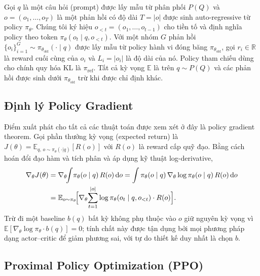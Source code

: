 \documentclass[11pt,a4paper]{article}
\begin{document}
Gọi \(q\) là một câu hỏi (prompt) được lấy mẫu từ phân phối \(P(Q)\) và
\(o=(o_1,\ldots,o_T)\) là một phản hồi có độ dài \(T=|o|\) được sinh
auto-regressive từ policy \(\pi_\theta\). Chúng tôi ký hiệu \(o_{<t}=(o_1,\ldots,o_{t-1})\)
cho tiền tố và định nghĩa policy theo token
\(\pi_\theta(o_t\mid q,o_{<t})\). Với một nhóm \(G\) phản hồi
\(\{o_i\}_{i=1}^G\sim\pi_{\theta_{\text{old}}}(\cdot\mid q)\) được lấy mẫu từ
policy hành vi đóng băng \(\pi_{\theta_{\text{old}}}\), gọi \(r_i\in\mathbb{R}\) là
reward cuối cùng của \(o_i\) và \(L_i=|o_i|\) là độ dài của nó. Policy tham chiếu dùng cho
chính quy hóa KL là \(\pi_{\text{ref}}\). Tất cả kỳ vọng \(\mathbb{E}\) là trên
\(q\sim P(Q)\) và các phản hồi được sinh dưới \(\pi_{\theta_{\text{old}}}\) trừ khi
được chỉ định khác.

\subsection{Định lý Policy Gradient}

Điểm xuất phát cho tất cả các thuật toán được xem xét ở đây là policy gradient theorem.
Gọi phần thưởng kỳ vọng (expected return) là
\(J(\theta) = \mathbb{E}_{q,\,o\sim\pi_\theta(\cdot|q)}[R(o)]\) với \(R(o)\) là
reward cấp quỹ đạo. Bằng cách hoán đổi đạo hàm và tích phân và áp dụng
kỹ thuật log-derivative,
\begin{align}
\nabla_\theta J(\theta)
  &= \nabla_\theta \!\!\int\! \pi_\theta(o\mid q)\,R(o)\,\mathrm{d}o
   = \int \pi_\theta(o\mid q)\,\nabla_\theta\log\pi_\theta(o\mid q)\,R(o)\,\mathrm{d}o
   \nonumber \\
  &= \mathbb{E}_{o\sim\pi_\theta}\!\Bigl[
        \nabla_\theta\!\sum_{t=1}^{|o|}\log\pi_\theta(o_t\mid q,o_{<t})\cdot R(o)
     \Bigr]. \label{eq:pg_theorem}
\end{align}
Trừ đi một baseline \(b(q)\) bất kỳ không phụ thuộc vào \(o\) giữ nguyên kỳ vọng
vì \(\mathbb{E}[\nabla_\theta\log\pi_\theta\cdot b(q)]=0\); tính chất
này được tận dụng bởi mọi phương pháp dạng actor--critic để giảm phương sai,
với tự do thiết kế duy nhất là chọn \(b\).

\subsection{Proximal Policy Optimization (PPO)}
\end{document}
